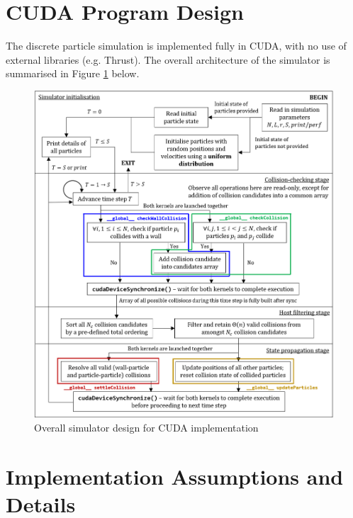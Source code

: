\documentclass[12pt]{article}
\begin{document}
\maketitle
\setcounter{tocdepth}{1}
\tableofcontents

\pagebreak
\section{CUDA Program Design}

The discrete particle simulation is implemented fully in CUDA, with no use of external libraries (e.g. Thrust). The overall architecture of the simulator is summarised in Figure \ref{fig:simulator-design} below.\\

\begin{figure}[H]
    \includegraphics{chap1Flowchart-CUDA}
    \centering
    \caption{Overall simulator design for CUDA implementation}
    \label{fig:simulator-design}
\end{figure}

\pagebreak

\section{Implementation Assumptions and Details}
\end{document}
